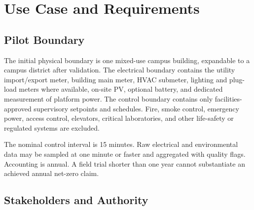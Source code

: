 \section{Use Case and Requirements}

\subsection{Pilot Boundary}

The initial physical boundary is one mixed-use campus building, expandable to a campus district after validation. The electrical boundary contains the utility import/export meter, building main meter, HVAC submeter, lighting and plug-load meters where available, on-site PV, optional battery, and dedicated measurement of platform power. The control boundary contains only facilities-approved supervisory setpoints and schedules. Fire, smoke control, emergency power, access control, elevators, critical laboratories, and other life-safety or regulated systems are excluded.

The nominal control interval is 15 minutes. Raw electrical and environmental data may be sampled at one minute or faster and aggregated with quality flags. Accounting is annual. A field trial shorter than one year cannot substantiate an achieved annual net-zero claim.

\subsection{Stakeholders and Authority}

